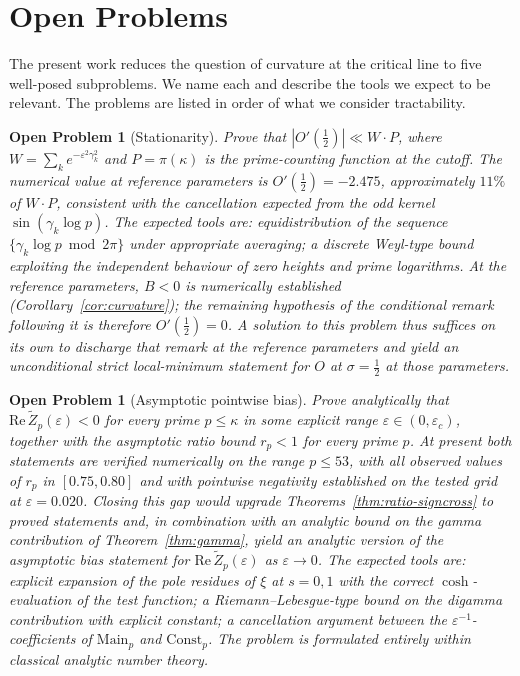 \documentclass[11pt]{article}
\newtheorem{openproblem}[theorem]{Open Problem}
\newcommand{\Zt}{\widetilde{Z}}
\begin{document}
\section{Open Problems}
\label{sec:open}

The present work reduces the question of curvature at the critical
line to five well-posed subproblems.
We name each and describe the tools we expect to be relevant.
The problems are listed in order of what we consider tractability.

\begin{openproblem}[Stationarity]\label{op:stat}
\label{op:stat}
Prove that $|O'(\tfrac12)|\ll W\cdot P$, where
$W=\sum_k e^{-\varepsilon^2\gamma_k^2}$ and $P=\pi(\kappa)$ is the
prime-counting function at the cutoff.
The numerical value at reference parameters is $O'(\tfrac12)=-2.475$,
approximately $11\%$ of $W\cdot P$, consistent with the cancellation
expected from the odd kernel $\sin(\gamma_k\log p)$.
The expected tools are: equidistribution of the sequence
$\{\gamma_k\log p\bmod 2\pi\}$ under appropriate averaging; a discrete
Weyl-type bound exploiting the independent behaviour of zero heights
and prime logarithms.
At the reference parameters, $B<0$ is numerically established
(Corollary~\ref{cor:curvature}); the remaining hypothesis of the
conditional remark following it is therefore $O'(\tfrac12)=0$.
A solution to this problem thus suffices on its own to discharge that
remark at the reference parameters and yield an unconditional strict
local-minimum statement for $O$ at $\sigma=\tfrac12$ at those
parameters.
\end{openproblem}

\begin{openproblem}[Asymptotic pointwise bias]\label{op:bias}
\label{op:bias-asymp}
Prove analytically that $\mathrm{Re}\,\Zt_p(\varepsilon)<0$ for every
prime $p\le\kappa$ in some explicit range $\varepsilon\in(0,\varepsilon_c)$,
together with the asymptotic ratio bound $r_p<1$ for every prime $p$.
At present both statements are verified numerically on the range
$p\le 53$, with all observed values of $r_p$ in $[0.75,0.80]$ and with
pointwise negativity established on the tested grid at
$\varepsilon=0.020$.
Closing this gap would upgrade Theorems~\ref{thm:ratio-signcross}
to proved statements and, in combination with an analytic bound on the
gamma contribution of Theorem~\ref{thm:gamma}, yield an analytic
version of the asymptotic bias statement for
$\mathrm{Re}\,\Zt_p(\varepsilon)$ as $\varepsilon\to 0$.
The expected tools are: explicit expansion of the pole residues of
$\xi$ at $s=0,1$ with the correct $\cosh$-evaluation of the test
function; a Riemann--Lebesgue-type bound on the digamma contribution
with explicit constant; a cancellation argument between the
$\varepsilon^{-1}$-coefficients of $\mathrm{Main}_p$ and
$\mathrm{Const}_p$.
The problem is formulated entirely within classical analytic number theory.
\end{openproblem}
\end{document}
